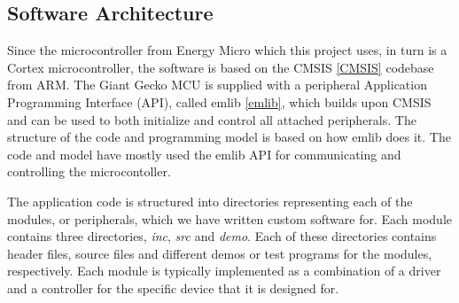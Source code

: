 \subsection{Software Architecture}


Since the microcontroller from Energy Micro which this project uses, in turn is
a Cortex microcontroller, the software is based on the CMSIS \ref{CMSIS}
codebase from ARM. The Giant Gecko MCU is supplied with a peripheral Application
Programming Interface (API), called emlib \ref{emlib}, which builds upon CMSIS
and can be used to both initialize and control all attached peripherals. The
structure of the code and programming model is based on how emlib does it. The
code and model have mostly used the emlib API for communicating and controlling
the microcontoller.



The application code is structured into directories representing each of the
modules, or peripherals, which we have written custom software for. Each module
contains three directories, \textit{inc}, \textit{src} and \textit{demo}. Each
of these directories contains header files, source files and different demos or
test programs for the modules, respectively. Each module is typically
implemented as a combination of a driver and a controller for the specific
device that it is designed for.
